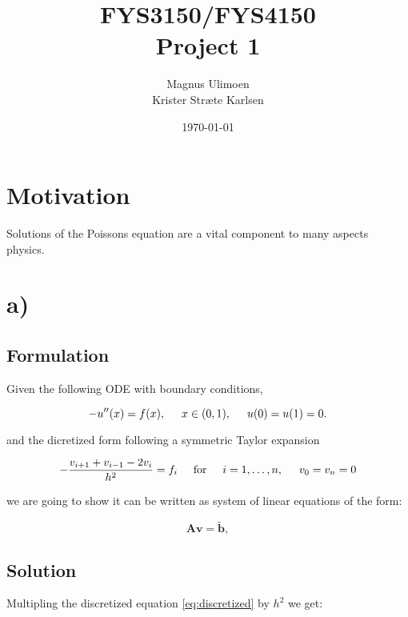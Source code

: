 \documentclass[11pt,a4paper,english]{article}
\title{FYS3150/FYS4150 \\Project 1}
\author{Magnus Ulimoen\\Krister Stræte Karlsen}
\date{\today}
\newcommand{\ve}[1]{\mathbf{#1}} %
\newcommand{\spac}{\hspace{5mm}}
\begin{document}
\maketitle

\section{Motivation}

Solutions of the Poissons equation are a vital component to many aspects physics.


\section{a)}

\subsection*{Formulation}

Given the following ODE with boundary conditions, 

\begin{equation}
-u''(x) = f(x), \spac x \in (0,1), \spac u(0) = u(1) = 0.
\end{equation}

and the dicretized form following a symmetric Taylor expansion

\begin{equation}
-\frac{v_{i+1}+v_{i-1}-2v_i}{h^2} = f_i  \spac \mathrm{for} \spac i=1,\dots, n, \spac v_0 = v_{n} = 0
\label{eq:discretized}
\end{equation}

we are going to show it can be written as system of linear equations of the form: 

\begin{equation}
   \ve{A}\ve{v} = \tilde{\ve{b}},
   \label{eq:Avb}
\end{equation}


\subsection*{Solution}
Multipling the discretized equation \eqref{eq:discretized} by $h^2$ we get:
\end{document}
